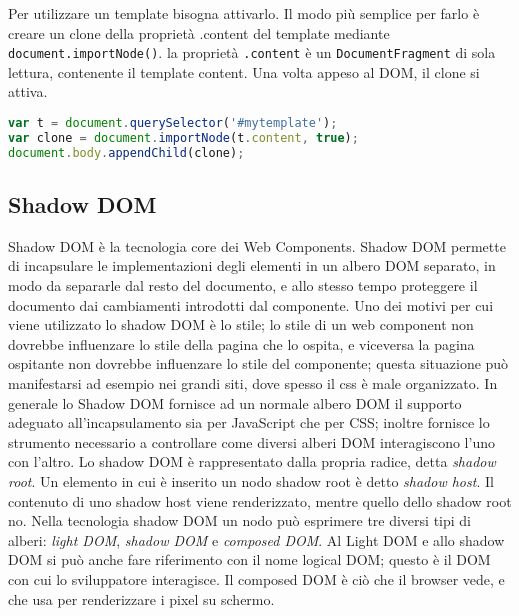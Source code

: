 Per utilizzare un template bisogna attivarlo. Il modo più semplice per farlo è creare un clone della proprietà .content del template mediante \texttt{document.importNode()}. la proprietà \texttt{.content} è un \texttt{DocumentFragment} di sola lettura, contenente il template content. Una volta appeso al DOM, il clone si attiva.
\begin{lstlisting}[language=JavaScript]
var t = document.querySelector('#mytemplate');
var clone = document.importNode(t.content, true);
document.body.appendChild(clone);
\end{lstlisting}

\subsection{Shadow DOM}
\label{sec:chapter_tecnologie_abilitanti_shadow_dom}

Shadow DOM è la tecnologia core dei Web Components. Shadow DOM permette di incapsulare le implementazioni degli elementi in un albero DOM separato, in modo da separarle dal resto del documento, e allo stesso tempo proteggere il documento dai cambiamenti introdotti dal componente. Uno dei motivi per cui viene utilizzato lo shadow DOM è lo stile; lo stile di un web component non dovrebbe influenzare lo stile della pagina che lo ospita, e viceversa la pagina ospitante non dovrebbe influenzare lo stile del componente; questa situazione può manifestarsi ad esempio nei grandi siti, dove spesso il css è male organizzato. In generale lo Shadow DOM fornisce ad un normale albero DOM il supporto adeguato all’incapsulamento sia per JavaScript che per CSS; inoltre fornisce lo strumento necessario a controllare come diversi alberi DOM interagiscono l’uno con l’altro. 
Lo shadow DOM è rappresentato dalla propria radice, detta \emph{shadow root}.
Un elemento in cui è inserito un nodo shadow root è detto \emph{shadow host}. Il contenuto di uno shadow host viene renderizzato, mentre quello dello shadow root no. 
Nella tecnologia shadow DOM un nodo può esprimere tre diversi tipi di alberi: \emph{light DOM}, \emph{shadow DOM} e \emph{composed DOM}.
Al Light DOM e allo shadow DOM si può anche fare riferimento con il nome logical DOM; questo è il DOM con cui lo sviluppatore interagisce. Il composed DOM è ciò che il browser vede, e che usa per renderizzare i pixel su schermo.


